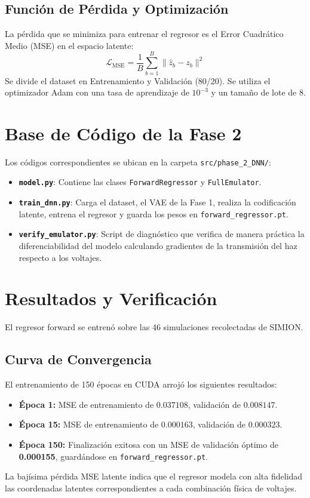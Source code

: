 \documentclass[12pt,letterpaper]{article}
\begin{document}
\subsection{Función de Pérdida y Optimización}
La pérdida que se minimiza para entrenar el regresor es el Error Cuadrático Medio (MSE) en el espacio latente:
\begin{equation}
    \mathcal{L}_{\text{MSE}} = \frac{1}{B} \sum_{b=1}^{B} \|\hat{z}_b - z_b\|^2
\end{equation}
Se divide el dataset en Entrenamiento y Validación (80/20). Se utiliza el optimizador Adam con una tasa de aprendizaje de $10^{-3}$ y un tamaño de lote de 8.

\section{Base de Código de la Fase 2}
Los códigos correspondientes se ubican en la carpeta \texttt{src/phase\_2\_DNN/}:
\begin{itemize}
    \item \textbf{\texttt{model.py}}: Contiene las clases \texttt{ForwardRegressor} y \texttt{FullEmulator}.
    \item \textbf{\texttt{train\_dnn.py}}: Carga el dataset, el VAE de la Fase 1, realiza la codificación latente, entrena el regresor y guarda los pesos en \texttt{forward\_regressor.pt}.
    \item \textbf{\texttt{verify\_emulator.py}}: Script de diagnóstico que verifica de manera práctica la diferenciabilidad del modelo calculando gradientes de la transmisión del haz respecto a los voltajes.
\end{itemize}

\section{Resultados y Verificación}
El regresor forward se entrenó sobre las 46 simulaciones recolectadas de SIMION.

\subsection{Curva de Convergencia}
El entrenamiento de 150 épocas en CUDA arrojó los siguientes resultados:
\begin{itemize}
    \item \textbf{Época 1:} MSE de entrenamiento de $0.037108$, validación de $0.008147$.
    \item \textbf{Época 15:} MSE de entrenamiento de $0.000163$, validación de $0.000323$.
    \item \textbf{Época 150:} Finalización exitosa con un MSE de validación óptimo de \textbf{0.000155}, guardándose en \texttt{forward\_regressor.pt}.
\end{itemize}
La bajísima pérdida MSE latente indica que el regresor modela con alta fidelidad las coordenadas latentes correspondientes a cada combinación física de voltajes.
\end{document}
